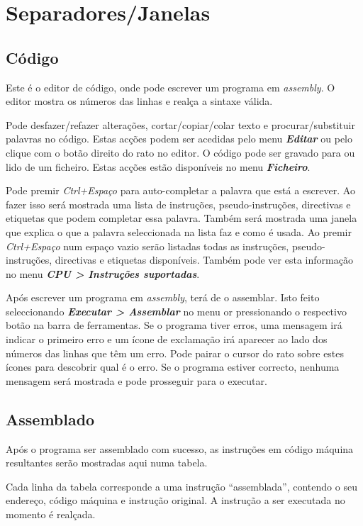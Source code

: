 \documentclass[11pt,a4paper,twoside,titlepage]{article}
\newcommand{\menupath}[1]{\textbf{\emph{#1}}}
\begin{document}
\section{Separadores/Janelas}

\subsection{Código}

Este é o editor de código, onde pode escrever um programa em \emph{assembly}.
O editor mostra os números das linhas e realça a sintaxe válida.

Pode desfazer/refazer alterações, cortar/copiar/colar texto e 
procurar/substituir palavras no código. Estas acções podem ser acedidas pelo
menu \menupath{Editar} ou pelo clique com o botão direito do rato no editor.
O código pode ser gravado para ou lido de um ficheiro. Estas acções estão
disponíveis no menu \menupath{Ficheiro}.

Pode premir \emph{Ctrl+Espaço} para auto-completar a palavra que está a escrever.
Ao fazer isso será mostrada uma lista de instruções, pseudo-instruções,
directivas e etiquetas que podem completar essa palavra.
Também será mostrada uma janela que explica o que a palavra seleccionada na lista
faz e como é usada.
Ao premir \emph{Ctrl+Espaço} num espaço vazio serão listadas todas as instruções,
pseudo-instruções, directivas e etiquetas disponíveis.
Também pode ver esta informação no menu \menupath{CPU > Instruções suportadas}.

Após escrever um programa em \emph{assembly}, terá de o assemblar.
Isto feito seleccionando \menupath{Executar > Assemblar} no menu or pressionando
o respectivo botão na barra de ferramentas.
Se o programa tiver erros, uma mensagem irá indicar o primeiro erro e um ícone de
exclamação irá aparecer ao lado dos números das linhas que têm um erro.
Pode pairar o cursor do rato sobre estes ícones para descobrir qual é o erro.
Se o programa estiver correcto, nenhuma mensagem será mostrada e pode prosseguir
para o executar.


\subsection{Assemblado} \label{sec:assembled}

Após o programa ser assemblado com sucesso, as instruções em código máquina
resultantes serão mostradas aqui numa tabela.

Cada linha da tabela corresponde a uma instrução ``assemblada'', contendo o seu
endereço, código máquina e instrução original.
A instrução a ser executada no momento é realçada.
\end{document}
